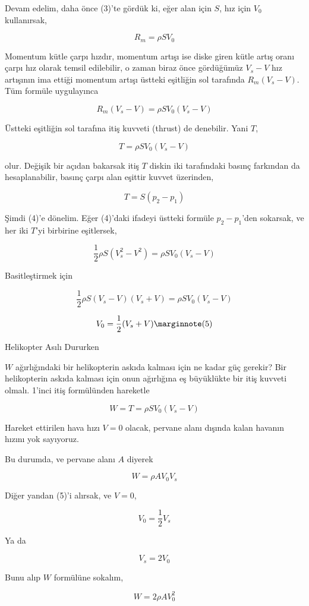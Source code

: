 \documentclass[12pt,fleqn]{article}\usepackage{../../common}
\begin{document}
Devam edelim, daha önce (3)'te gördük ki, eğer alan için $S$, hız için
$V_0$ kullanırsak, 

$$
R_m = \rho S V_0
$$

Momentum kütle çarpı hızdır, momentum artışı ise diske giren kütle artış
oranı çarpı hız olarak temsil edilebilir, o zaman biraz önce gördüğümüz
$V_s-V$ hız artışının ima ettiği momentum artışı üstteki eşitliğin sol
tarafında $R_m (V_s - V)$. Tüm formüle uygulayınca 

$$
R_m (V_s - V) = \rho S V_0  (V_s - V)
$$

Üstteki eşitliğin sol tarafına itiş kuvveti (thrust) de denebilir. Yani
$T$,

$$
T = \rho S V_0  (V_s - V)
$$

olur. Değişik bir açıdan bakarsak itiş $T$ diskin iki tarafındaki basınç
farkından da hesaplanabilir, basınç çarpı alan eşittir kuvvet üzerinden,

$$
T = S (p_2 - p_1)
$$

Şimdi (4)'e dönelim. Eğer (4)'daki ifadeyi üstteki formüle $p_2-p_1$'den
sokarsak, ve her iki $T$'yi birbirine eşitlersek, 

$$
\frac{1}{2} \rho S (V_s^2 - V^2) = \rho S V_0 (V_s - V)
$$

Basitleştirmek için

$$
\frac{1}{2} \rho S (V_s - V)(V_s + V) = \rho S V_0 (V_s - V)
$$

$$
V_0 = \frac{1}{2} (V_s + V)  
\mlabel{5}
$$

Helikopter Asılı Dururken

$W$ ağırlığındaki bir helikopterin askıda kalması için ne kadar güç
gerekir? Bir helikopterin askıda kalması için onun ağırlığına eş büyüklükte
bir itiş kuvveti olmalı. 1'inci itiş formülünden hareketle

$$
W = T = \rho S V_0  (V_s - V)
$$

Hareket ettirilen hava hızı $V = 0$ olacak, pervane alanı dışında kalan
havanın hızını yok sayıyoruz.

Bu durumda, ve pervane alanı $A$ diyerek

$$
W = \rho A V_0 V_s
$$

Diğer yandan (5)'i alırsak, ve $V=0$,

$$
V_0 = \frac{1}{2} V_s
$$

Ya da

$$
V_s = 2 V_0
$$

Bunu alıp $W$ formülüne sokalım,

$$
W = 2 \rho A V_0^2
$$
\end{document}
